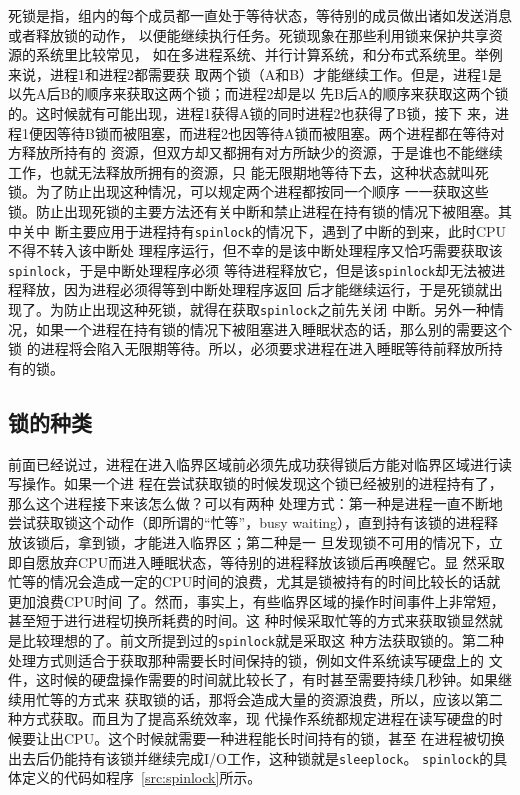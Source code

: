 \documentclass{swfuthesism}
\begin{document}
死锁是指，组内的每个成员都一直处于等待状态，等待别的成员做出诸如发送消息或者释放锁的动作，
以便能继续执行任务\cite{Coulouris12}。死锁现象在那些利用锁来保护共享资源的系统里比较常见，
如在多进程系统、并行计算系统，和分布式系统里\cite{padua11}。举例来说，进程1和进程2都需要获
取两个锁（A和B）才能继续工作。但是，进程1是以先A后B的顺序来获取这两个锁；而进程2却是以
先B后A的顺序来获取这两个锁的。这时候就有可能出现，进程1获得A锁的同时进程2也获得了B锁，接下
来，进程1便因等待B锁而被阻塞，而进程2也因等待A锁而被阻塞。两个进程都在等待对方释放所持有的
资源，但双方却又都拥有对方所缺少的资源，于是谁也不能继续工作，也就无法释放所拥有的资源，只
能无限期地等待下去，这种状态就叫死锁。为了防止出现这种情况，可以规定两个进程都按同一个顺序
一一获取这些锁。防止出现死锁的主要方法还有关中断和禁止进程在持有锁的情况下被阻塞。其中关中
断主要应用于进程持有\texttt{spinlock}的情况下，遇到了中断的到来，此时CPU不得不转入该中断处
理程序运行，但不幸的是该中断处理程序又恰巧需要获取该\texttt{spinlock}，于是中断处理程序必须
等待进程释放它，但是该\texttt{spinlock}却无法被进程释放，因为进程必须得等到中断处理程序返回
后才能继续运行，于是死锁就出现了。为防止出现这种死锁，就得在获取\texttt{spinlock}之前先关闭
中断。另外一种情况，如果一个进程在持有锁的情况下被阻塞进入睡眠状态的话，那么别的需要这个锁
的进程将会陷入无限期等待。所以，必须要求进程在进入睡眠等待前释放所持有的锁。

\subsection{锁的种类}

前面已经说过，进程在进入临界区域前必须先成功获得锁后方能对临界区域进行读写操作。如果一个进
程在尝试获取锁的时候发现这个锁已经被别的进程持有了，那么这个进程接下来该怎么做？可以有两种
处理方式：第一种是进程一直不断地尝试获取锁这个动作（即所谓的``忙等''，busy
waiting）\cite{wiki:Busywating}，直到持有该锁的进程释放该锁后，拿到锁，才能进入临界区；第二种是一
旦发现锁不可用的情况下，立即自愿放弃CPU而进入睡眠状态，等待别的进程释放该锁后再唤醒它。显
然采取忙等的情况会造成一定的CPU时间的浪费，尤其是锁被持有的时间比较长的话就更加浪费CPU时间
了。然而，事实上，有些临界区域的操作时间事件上非常短，甚至短于进行进程切换所耗费的时间。这
种时候采取忙等的方式来获取锁显然就是比较理想的了。前文所提到过的\texttt{spinlock}就是采取这
种方法获取锁的。第二种处理方式则适合于获取那种需要长时间保持的锁，例如文件系统读写硬盘上的
文件，这时候的硬盘操作需要的时间就比较长了，有时甚至需要持续几秒钟。如果继续用忙等的方式来
获取锁的话，那将会造成大量的资源浪费，所以，应该以第二种方式获取。而且为了提高系统效率，现
代操作系统都规定进程在读写硬盘的时候要让出CPU。这个时候就需要一种进程能长时间持有的锁，甚至
在进程被切换出去后仍能持有该锁并继续完成I/O工作，这种锁就是\texttt{sleeplock}。
\texttt{spinlock}的具体定义的代码如程序~\ref{src:spinlock}所示。 
\end{document}
